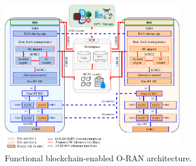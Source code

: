 \documentclass[journal]{IEEEtran}
\begin{document}
	\begin{figure}[ht!]    
		\centering
		\includegraphics[width=0.7\textwidth]{functionalarchitecture.pdf}
		\caption{Functional blockchain-enabled O-RAN architecture.}
		\label{fig:functionalarchitecture}
	\end{figure}
	
\end{document}
